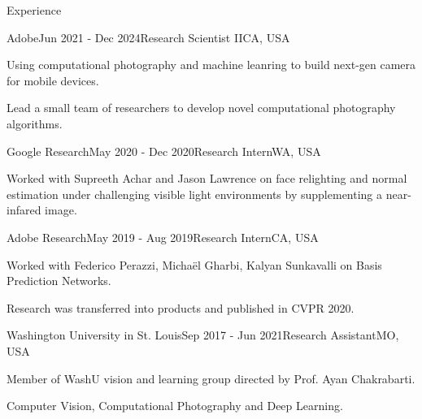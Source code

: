 \documentclass{resume} %
\begin{document}
\begin{rSection}{Experience}


\begin{rSubsection}{Adobe}{Jun 2021 - Dec 2024}{Research Scientist II}{CA, USA}
\item Using computational photography and machine leanring to build next-gen camera for mobile devices.
\item Lead a small team of researchers to develop novel computational photography algorithms.

\end{rSubsection}



\begin{rSubsection}{Google Research}{May 2020 - Dec 2020}{Research Intern}{WA, USA}
\item Worked with Supreeth Achar and Jason Lawrence on face relighting and normal estimation under challenging visible light environments by supplementing a near-infared image.

\end{rSubsection}


\begin{rSubsection}{Adobe Research}{May 2019 - Aug 2019}{Research Intern}{CA, USA}
\item Worked with Federico Perazzi, Micha\"el Gharbi, Kalyan Sunkavalli on Basis Prediction Networks.
\item Research was transferred into products and published in CVPR 2020.

\end{rSubsection}

\begin{rSubsection}{Washington University in St. Louis}{Sep 2017 - Jun 2021}{Research Assistant}{MO, USA}
\item Member of WashU vision and learning group directed by Prof. Ayan Chakrabarti.
\item Computer Vision, Computational Photography and Deep Learning.
\end{rSubsection}


\end{rSection}
\end{document}
